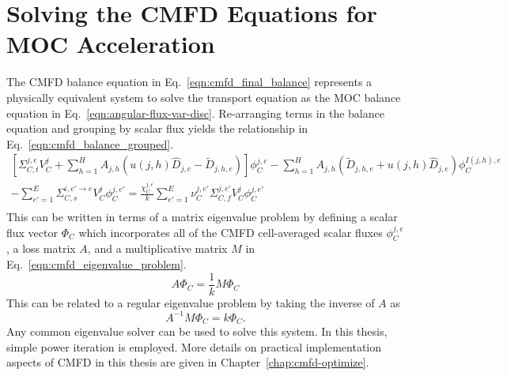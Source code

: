 \section{Solving the CMFD Equations for MOC Acceleration}
The CMFD balance equation in Eq.~\ref{eqn:cmfd_final_balance} represents a physically equivalent system to solve the transport equation as the MOC balance equation in Eq.~\ref{eqn:angular-flux-var-disc}. Re-arranging terms in the balance equation and grouping by scalar flux yields the relationship in Eq.~\ref{eqn:cmfd_balance_grouped}.
\begin{equation}
	\begin{split}
		\left[\Sigma_{C,t}^{j,e} V_C^j + \sum_{h=1}^H A_{j,h} \left(u(j,h) \hat{D}_{j,e} - \tilde{D}_{j,h,e} \right) \right] \phi_C^{j,e} - \sum_{h=1}^H A_{j,h} \left( \tilde{D}_{j,h,e} + u(j,h) \hat{D}_{j,e} \right) \phi_C^{I(j,h),e} & \\ - \sum_{e'=1}^E  \Sigma_{C,s}^{i, e' \rightarrow e} V_C^j \phi_C^{j,e'} =
		\frac{\chi_C^{j,e}}{k} \sum_{e'=1}^{E} \nu_C^{j, e'} \Sigma_{C,f}^{j,e'} V_C^j \phi_C^{j,e'} & \\
	\end{split}
	\label{eqn:cmfd_balance_grouped}
\end{equation}
This can be written in terms of a matrix eigenvalue problem by defining a scalar flux vector $\Phi_C$ which incorporates all of the CMFD cell-averaged scalar fluxes $\phi_C^{j,e}$, a loss matrix $A$, and a multiplicative matrix $M$ in Eq.~\ref{eqn:cmfd_eigenvalue_problem}.
\begin{equation}
	A \Phi_C = \frac{1}{k} M \Phi_C
	\label{eqn:cmfd_eigenvalue_problem}
\end{equation}
This can be related to a regular eigenvalue problem by taking the inverse of $A$ as
\begin{equation}
	A^{-1} M \Phi_C = k \Phi_C.
\end{equation}
Any common eigenvalue solver can be used to solve this system. In this thesis, simple power iteration is employed. More details on practical implementation aspects of CMFD in this thesis are given in Chapter~\ref{chap:cmfd-optimize}.

